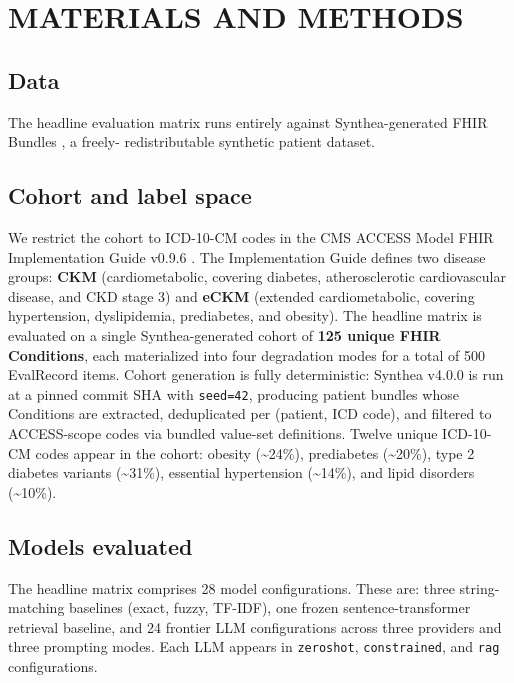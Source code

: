 \section{MATERIALS AND METHODS}\label{materials-and-methods}

\subsection{Data}\label{data}

The headline evaluation matrix runs entirely against
Synthea-generated FHIR Bundles \autocite{Walonoski2018}, a freely-
redistributable synthetic patient dataset. 

\subsection{Cohort and label space}\label{cohort-and-label-space}

We restrict the cohort to ICD-10-CM codes in the CMS ACCESS Model
FHIR Implementation Guide v0.9.6 \autocite{CMS2026}. The Implementation
Guide defines two disease groups: \textbf{CKM} (cardiometabolic, covering
diabetes, atherosclerotic cardiovascular disease, and CKD stage 3)
and \textbf{eCKM} (extended cardiometabolic, covering hypertension,
dyslipidemia, prediabetes, and obesity). The headline matrix is
evaluated on a single Synthea-generated cohort of \textbf{125 unique FHIR
Conditions}, each materialized into four degradation modes for a
total of 500 EvalRecord items. Cohort generation is fully
deterministic: Synthea v4.0.0 \autocite{Walonoski2018} is run at a pinned
commit SHA with \texttt{seed=42}, producing patient bundles whose
Conditions are extracted, deduplicated per (patient, ICD code), and
filtered to ACCESS-scope codes via bundled value-set definitions.
Twelve unique ICD-10-CM codes appear in the cohort: obesity (\textasciitilde24\%),
prediabetes (\textasciitilde20\%), type 2 diabetes variants (\textasciitilde31\%), essential
hypertension (\textasciitilde14\%), and lipid disorders (\textasciitilde10\%).

\subsection{Models evaluated}\label{models-evaluated}

The headline matrix comprises 28 model configurations. These are:
three string-matching baselines (exact, fuzzy, TF-IDF), one frozen
sentence-transformer retrieval baseline, and 24 frontier LLM
configurations across three providers and three prompting modes.
Each LLM appears in \texttt{zeroshot}, \texttt{constrained}, and \texttt{rag}
configurations.

